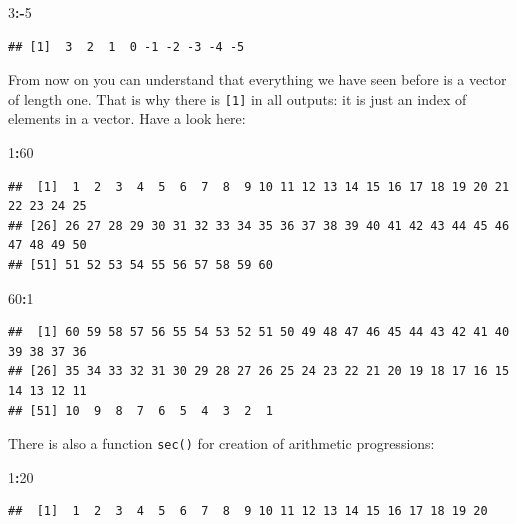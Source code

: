\documentclass[
]{book}
\newenvironment{Shaded}{\begin{snugshade}}{\end{snugshade}}
\newcommand{\DecValTok}[1]{\textcolor[rgb]{0.00,0.00,0.81}{#1}}
\newcommand{\OperatorTok}[1]{\textcolor[rgb]{0.81,0.36,0.00}{\textbf{#1}}}
\begin{document}
\begin{Shaded}
\begin{Highlighting}[]
\DecValTok{3}\OperatorTok{:-}\DecValTok{5}
\end{Highlighting}
\end{Shaded}

\begin{verbatim}
## [1]  3  2  1  0 -1 -2 -3 -4 -5
\end{verbatim}

From now on you can understand that everything we have seen before is a vector of length one. That is why there is \texttt{{[}1{]}} in all outputs: it is just an index of elements in a vector. Have a look here:

\begin{Shaded}
\begin{Highlighting}[]
\DecValTok{1}\OperatorTok{:}\DecValTok{60}
\end{Highlighting}
\end{Shaded}

\begin{verbatim}
##  [1]  1  2  3  4  5  6  7  8  9 10 11 12 13 14 15 16 17 18 19 20 21 22 23 24 25
## [26] 26 27 28 29 30 31 32 33 34 35 36 37 38 39 40 41 42 43 44 45 46 47 48 49 50
## [51] 51 52 53 54 55 56 57 58 59 60
\end{verbatim}

\begin{Shaded}
\begin{Highlighting}[]
\DecValTok{60}\OperatorTok{:}\DecValTok{1}
\end{Highlighting}
\end{Shaded}

\begin{verbatim}
##  [1] 60 59 58 57 56 55 54 53 52 51 50 49 48 47 46 45 44 43 42 41 40 39 38 37 36
## [26] 35 34 33 32 31 30 29 28 27 26 25 24 23 22 21 20 19 18 17 16 15 14 13 12 11
## [51] 10  9  8  7  6  5  4  3  2  1
\end{verbatim}

There is also a function \texttt{sec()} for creation of arithmetic progressions:

\begin{Shaded}
\begin{Highlighting}[]
\DecValTok{1}\OperatorTok{:}\DecValTok{20}
\end{Highlighting}
\end{Shaded}

\begin{verbatim}
##  [1]  1  2  3  4  5  6  7  8  9 10 11 12 13 14 15 16 17 18 19 20
\end{verbatim}
\end{document}
